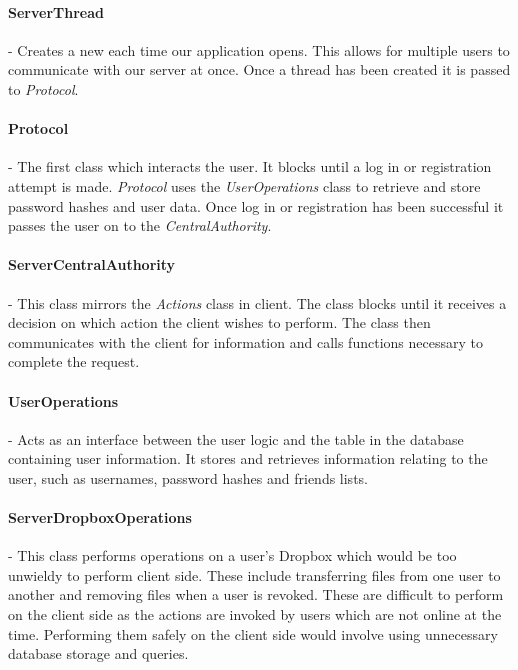 \documentclass[12pt, titlepage]{article}
\begin{document}
\paragraph*{ServerThread} - Creates a new each time our application opens. This allows for multiple users to communicate with our server at once. Once a thread has been created it is passed to \textit{Protocol}.

\paragraph*{Protocol} - The first class which interacts the user. It blocks until a log in or registration attempt is made. \textit{Protocol} uses the \textit{UserOperations} class to retrieve and store password hashes and user data. Once log in or registration has been successful it passes the user on to the \textit{CentralAuthority}.

\paragraph*{ServerCentralAuthority} - This class mirrors the \textit{Actions} class in client. The class blocks until it receives a decision on which action the client wishes to perform. The class then communicates with the client for information and calls functions necessary to complete the request.

\paragraph*{UserOperations} - Acts as an interface between the user logic and the table in the database containing user information. It stores and retrieves information relating to the user, such as usernames, password hashes and friends lists.

\paragraph*{ServerDropboxOperations} - This class performs operations on a user's Dropbox which would be too unwieldy to perform client side. These include transferring files from one user to another and removing files when a user is revoked. These are difficult to perform on the client side as the actions are invoked by users which are not online at the time. Performing them safely on the client side would involve using unnecessary database storage and queries.
\end{document}
